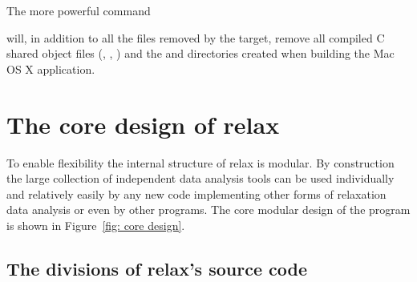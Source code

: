 The more powerful command


will, in addition to all the files removed by the  target, remove all compiled C shared object files (, , ) and the  and  directories created when building the Mac OS X application.




\section{The core design of relax}

To enable flexibility the internal structure of relax is modular.
By construction the large collection of independent data analysis tools can be used individually and relatively easily by any new code implementing other forms of relaxation data analysis or even by other programs.
The core modular design of the program is shown in Figure~\ref{fig: core design}.



\subsection{The divisions of relax's source code}


